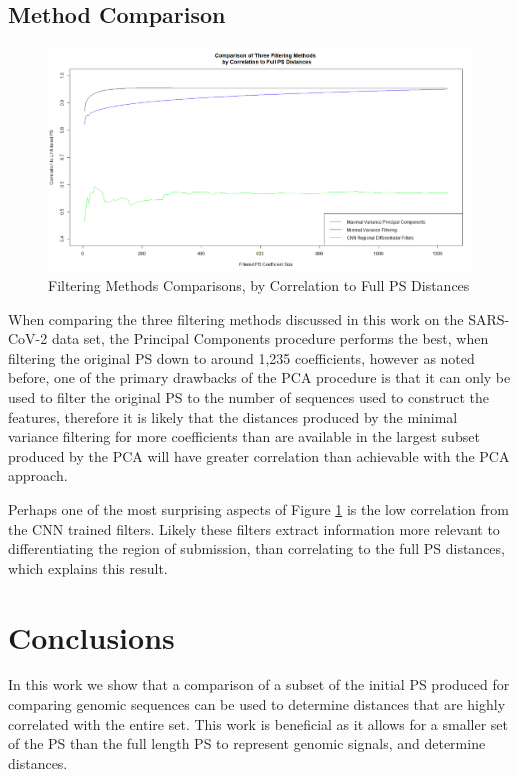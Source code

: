 \documentclass[12pt,conference]{IEEEtran}
\begin{document}
\subsection{Method Comparison} 

\begin{figure}[h!]
\caption{Filtering Methods Comparisons, by Correlation to Full PS Distances \label{fig:filtcomp}}
\includegraphics[scale=0.18]{Images/Files/PSFiltMethods.PNG}
\end{figure}

When comparing the three filtering methods discussed in this work on the SARS-CoV-2 data set, the Principal Components procedure performs 
the best, when filtering the original PS down to around 1,235 coefficients, however as noted before, one of the primary 
drawbacks of the PCA procedure is that it can only be used to filter the original PS to the number of sequences used to 
construct the features, therefore it is likely that the distances produced by the minimal variance filtering for more coefficients than are available in the largest subset produced by the PCA will have greater correlation than achievable with 
the PCA approach. 


Perhaps one of the most surprising aspects of Figure \ref{fig:filtcomp} is the low correlation from the CNN trained 
filters.  
Likely these filters extract information more relevant to differentiating the region of submission, than correlating to the 
full PS distances, which explains this result. 
\section{Conclusions}

In this work we show that a comparison of a subset of the initial PS produced for comparing genomic 
sequences can be used to determine distances that are highly correlated with the entire set. 
This work is beneficial as it allows for a smaller set of the PS than the full length PS to represent genomic signals, and 
determine distances. 
\end{document}
